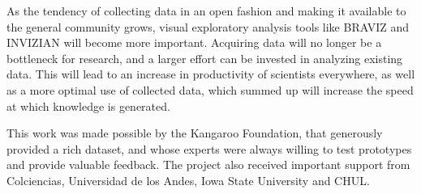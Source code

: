 \documentclass[twocolumn]{svjour3}
\begin{document}
As the tendency of collecting data in an open fashion and making it available to the general community grows, visual exploratory analysis tools like BRAVIZ and INVIZIAN will become more important. Acquiring data will no longer be a bottleneck for research, and a larger effort can be invested in analyzing existing data. This will lead to an increase in productivity of scientists everywhere, as well as a more optimal use of collected data, which summed up will increase the speed at which knowledge is generated.

\begin{acknowledgements}

This work was made possible by the Kangaroo Foundation, that generously provided a rich dataset, and whose experts were always willing to test prototypes and provide valuable feedback. The project also received important support from Colciencias, Universidad de los Andes, Iowa State University and CHUL.

\end{acknowledgements}

 

\end{document}
